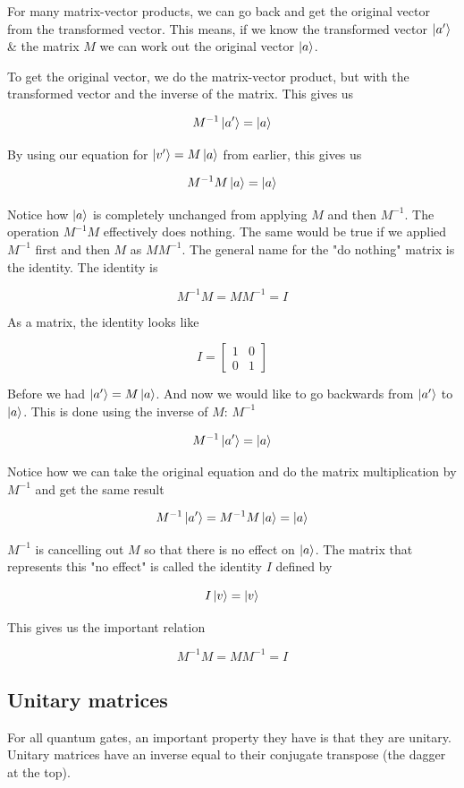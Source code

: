 \documentclass{book}
\begin{document}
For many matrix-vector products, we can go back and get the original vector from the transformed vector. This means, if we know the transformed vector $\ket{a'}$ \&  the matrix $M$ we can work out the original vector $\ket{a}$. 

To get the original vector, we do the matrix-vector product, but with the transformed vector and the inverse of the matrix. This gives us 

$$
M^{-1}\ket{a'} = \ket{a}
$$

By using our equation for $\ket{v'} = M\ket{a}$ from earlier, this gives us 

$$
M^{-1}M\ket{a} = \ket{a}
$$

Notice how $\ket{a}$ is completely unchanged from applying $M$ and then $M^{-1}$. The operation $M^{-1}M$ effectively does nothing. The same would be true if we applied $M^{-1}$ first and then $M$ as $MM^{-1}$. The general name for the "do nothing" matrix is the identity. The identity is

$$M^{-1}M = MM^{-1} = I $$

As a matrix, the identity looks like 

$$ 
I = \begin{bmatrix} 1 & 0 \\ 0 & 1 \end{bmatrix}
$$

Before we had $\ket{a'} = M\ket{a}$. And now we would like to go backwards from $\ket{a'}$ to $\ket{a}$. This is done using the inverse of $M$: $M^{-1}$

$$
 M^{-1}\ket{a'} = \ket{a} 
$$

Notice how we can take the original equation and do the matrix multiplication by $M^{-1}$ and get the same result

$$
M^{-1}\ket{a'} = M^{-1}M\ket{a} = \ket{a}
$$

$M^{-1}$ is cancelling out $M$ so that there is no effect on $\ket{a}$. The matrix that represents this "no effect" is called the identity $I$ defined by 


$$ I\ket{v} = \ket{v}$$

This gives us the important relation 


$$ M^{-1}M = MM^{-1} = I $$

\subsection{ Unitary matrices} 

For all quantum gates, an important property they have is that they are unitary. Unitary matrices have an inverse equal to their conjugate transpose (the dagger at the top).
\end{document}
